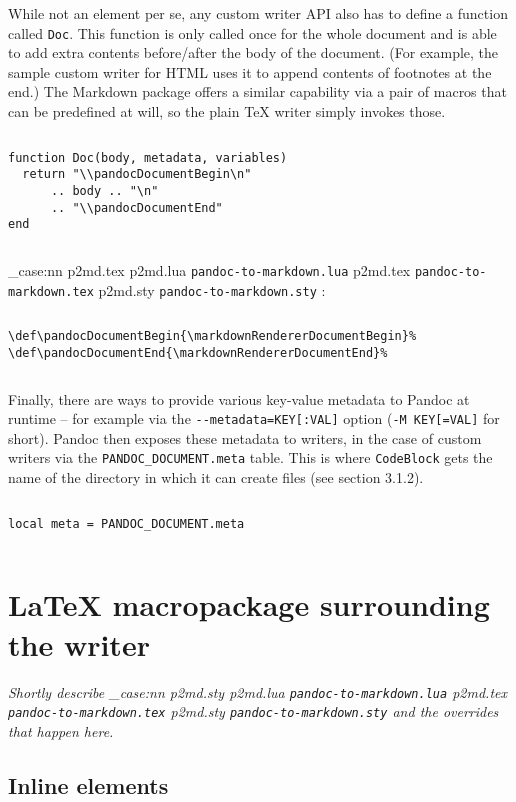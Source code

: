 \documentclass[
  digital,     %
  oneside,     %
  nosansbold,  %
  nocolorbold, %
  lof,         %
  lot,         %
]{fithesis4}
\newcommand\file[1]
  {
    \str_case:nn
      { #1 }
      {
        { p2md.lua } { \texttt{pandoc\hyp{}to\hyp{}markdown.lua} }
        { p2md.tex } { \texttt{pandoc\hyp{}to\hyp{}markdown.tex} }
        { p2md.sty } { \texttt{pandoc\hyp{}to\hyp{}markdown.sty} }
      }
  }
\begin{document}
While not an element per se, any custom writer API also has to define a function called \texttt{Doc}. This function is only called once for the whole document and is able to add extra contents before/after the body of the document. (For example, the sample custom writer for HTML uses it to append contents of footnotes at the end.) The Markdown package offers a similar capability via a pair of macros that can be predefined at will, so the plain \TeX{} writer simply invokes those.

$ $

\noindent
\lstset{language=[5.3]Lua}
\begin{lstlisting}
function Doc(body, metadata, variables)
  return "\\pandocDocumentBegin\n"
      .. body .. "\n"
      .. "\\pandocDocumentEnd"
end
\end{lstlisting}

$ $

\noindent
\file{p2md.tex}:

$ $

\noindent
\lstset{language=[plain]TeX}
\begin{lstlisting}
\def\pandocDocumentBegin{\markdownRendererDocumentBegin}%
\def\pandocDocumentEnd{\markdownRendererDocumentEnd}%
\end{lstlisting}

$ $

\noindent
Finally, there are ways to provide various key-value metadata to Pandoc at runtime -- for example via the \texttt{-{}-metadata=KEY[:VAL]} option (\texttt{-M KEY[=VAL]} for short). Pandoc then exposes these metadata to writers, in the case of custom writers via the \texttt{PANDOC\_DOCUMENT.meta} table. This is where \texttt{CodeBlock} gets the name of the directory in which it can create files (see section 3.1.2).

$ $

\noindent
\lstset{language=[5.3]Lua}
\begin{lstlisting}
local meta = PANDOC_DOCUMENT.meta
\end{lstlisting}

$ $

\section{\LaTeX{} macropackage surrounding the writer}
\emph{Shortly describe \file{p2md.sty} and the overrides that happen here.}
\subsection{Inline elements}
\end{document}
